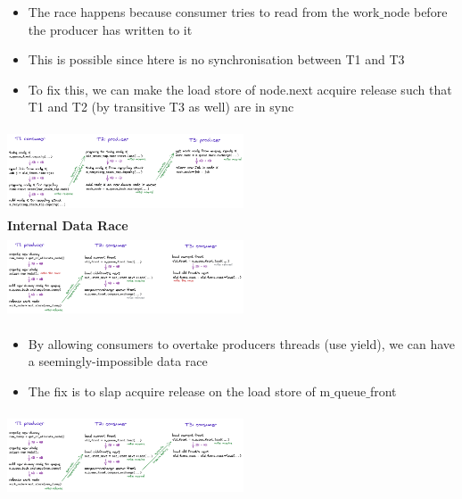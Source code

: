 \documentclass[10pt, landscape]{article}
\begin{document}
\begin{multicols}{4}
\begin{itemize}
    \item The race happens because consumer tries to read from the work$\_$node before the producer has written to it
    \item This is possible since htere is no synchronisation between T1 and T3 
    \item To fix this, we can make the load store of node.next acquire release such that T1 and T2 (by transitive T3 as well) are in sync
\end{itemize}
\includegraphics*[width=7cm,height=2.5cm]{recycling2.png} \\

\textbf{Internal Data Race} \\
\includegraphics*[width=7cm,height=2.5cm]{recycling3.png}
\begin{itemize}
    \item By allowing consumers to overtake producers threads (use yield), we can have a seemingly-impossible data race
    \item The fix is to slap acquire release on the load store of m$\_$queue$\_$front
\end{itemize}
\includegraphics*[width=7cm,height=2.5cm]{recycling4.png}\\


\end{multicols}
\end{document}
